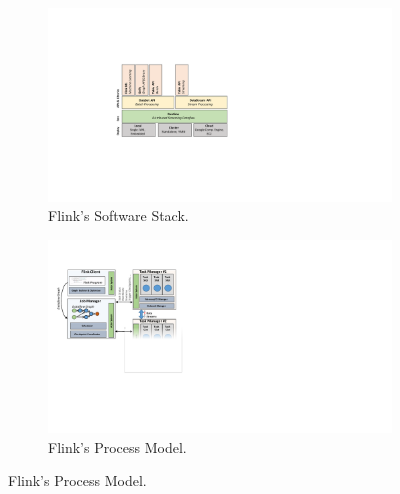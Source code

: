 \begin{figure}[t!]
\begin{minipage}{1.1\linewidth}
      \centering
      \hspace{-0.1\linewidth}
      \begin{minipage}{0.48\linewidth}
          \begin{figure}[H]
              \centering
			\includegraphics[width=.88\textwidth]{figs/stack}
			\caption{Flink's Software Stack.}
			\label{fig:stack}
          \end{figure}
      \end{minipage}
      \begin{minipage}{0.48\linewidth}
          \begin{figure}[H]
				\includegraphics[width=.95\textwidth]{figs/architecture.pdf}
    			\caption{Flink's Process Model.}
    			\label{fig:process-model}
          \end{figure}
      \end{minipage}
  \end{minipage}
\end{figure}

